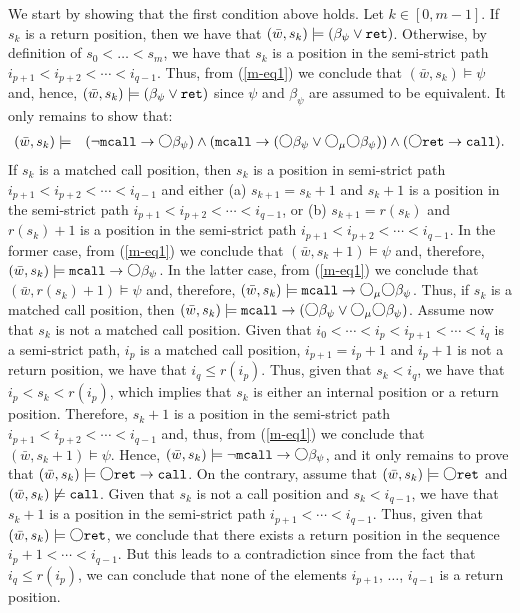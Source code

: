 \documentclass{LMCS}
\newcommand{\M}{{\mu}}
\newcommand{\w}{{\bar{w}}}
\newcommand{\dm}{\Diamond}
\newcommand{\next}{\text{\raisebox{1pt}{$\bigcirc$}}}
\theoremstyle{plain}
\theoremstyle{definition}
\newcommand{\mcall}{{\tt{mcall}}}
\newcommand{\rett}{{\tt ret}}
\newcommand{\call}{{\tt call}}
\newcommand{\dmm}{\dm_{\M}}
\renewcommand{\dm}{\next}
\renewcommand{\dmm}{\dm_\M}
\begin{document}
\begin{enumerate}[(a)]
We start by showing that the first condition above holds.  Let $k \in
[0,m-1]$. If $s_k$ is a return position, then we have that $(\w, s_k)
\models (\beta_\psi \vee \rett)$. Otherwise, by definition of $s_0 <
\ldots < s_m$, we have that $s_k$ is a position in the semi-strict
path $i_{p+1} < i_{p+2} < \cdots < i_{q-1}$. Thus, from
(\ref{m-eq1}) we conclude that $(\w, s_k) \models \psi$ and, hence,
$(\w, s_k) \models (\beta_\psi \vee \rett)$ since $\psi$ and
$\beta_\psi$ are assumed to be equivalent. It only remains to show
that:
\begin{eqnarray*}
(\w, s_k) & \models & (\neg \mcall \to \dm \beta_\psi) \wedge (\mcall
\to (\dm \beta_\psi \vee \dmm \dm \beta_\psi)) \wedge (\dm \rett
\to \call).
\end{eqnarray*}
If $s_k$ is a matched call position, then $s_k$ is a
position in semi-strict path $i_{p+1} < i_{p+2} < \cdots <
i_{q-1}$ and either (a) $s_{k+1} = s_k+1$ and $s_k+1$ is a position in
the semi-strict path $i_{p+1} < i_{p+2} < \cdots < i_{q-1}$,
or (b) $s_{k+1} = r(s_k)$ and $r(s_k)+1$ is a position in the
semi-strict path $i_{p+1} < i_{p+2} < \cdots < i_{q-1}$. In
the former case, from (\ref{m-eq1}) we conclude that $(\w, s_k+1)
\models \psi$ and, therefore, $(\w, s_k) \models \mcall \rightarrow
\dm \beta_\psi$. In the latter case, from (\ref{m-eq1}) we conclude
that $(\w, r(s_k)+1) \models \psi$ and, therefore, $(\w, s_k) \models
\mcall \rightarrow \dmm \dm \beta_\psi$. Thus, if $s_k$ is a matched
call position, then $(\w, s_k) \models \mcall \rightarrow (\dm
\beta_\psi \vee \dmm \dm \beta_\psi)$. Assume now that $s_k$ is not a
matched call position. Given that $i_0 < \cdots < i_p < i_{p+1} <
\cdots < i_q$ is a semi-strict path, $i_p$ is a matched call
position, $i_{p+1} = i_p+1$ and $i_p+1$ is not a return position, we
have that $i_q \leq r(i_p)$. Thus, given that $s_k < i_q$, we have
that $i_p < s_k < r(i_p)$, which implies that $s_k$ is either an
internal position or a return position. Therefore, $s_k+1$ is
a position in the semi-strict path $i_{p+1} < i_{p+2} < \cdots
< i_{q-1}$ and, thus, from (\ref{m-eq1}) we conclude that $(\w,
s_k+1) \models \psi$. Hence, $(\w,s_k)
\models \neg \mcall \to \dm \beta_\psi$, and it only remains to prove
that  $(\w, s_k) \models \dm \rett \to \call$. On the contrary,
assume that $(\w, s_k) \models \dm \rett$ and $(\w, s_k)
\not\models \call$. Given that $s_k$ is not a call position and $s_k <
i_{q-1}$, we have that $s_k+1$ is a position in the semi-strict
path $i_{p+1} < \cdots < i_{q-1}$. Thus, given that $(\w, s_k)
\models \dm \rett$, we conclude that there exists a return position in
the sequence $i_p+1 < \cdots < i_{q-1}$. But this leads to a
contradiction since from the fact that $i_q \leq r(i_p)$, we can
conclude that none of the elements $i_{p+1}$, $\ldots$, $i_{q-1}$ is a
return position. 


\end{enumerate}
\end{document}
